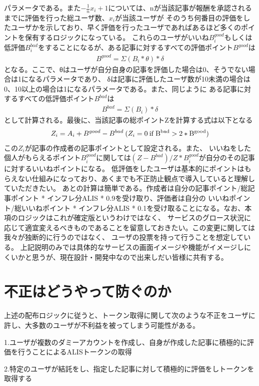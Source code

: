 \documentclass{jsarticle}
\begin{document}
パラメータである。また$-\frac{1}{n}x_{i}+1$については、nが当該記事が報酬を承認されるまでに評価を行った総ユーザ数、$x_{i}$が当該ユーザが
そのうち何番目の評価をしたユーザかを示しており、早く評価を行ったユーザであればあるほど多くのポイントを保有するロジックになっている。
これらのユーザがいいね$B^{good}_{i}$もしくは低評価$B^{bad}_{i}$をすることになるが、ある記事に対するすべての評価ポイント$B^{good}$は
\begin{align}
B^{good} = Σ (B_{i} * θ)  * δ 
\end{align}
となる。ここで、θはユーザが自分自身の記事を評価した場合は0、そうでない場合は1になるパラメータであり、
δは記事に評価したユーザ数が10未満の場合は0、10以上の場合は1になるパラメータである。また、同じように
ある記事に対するすべての低評価ポイント$B^{bad}$は
\begin{align}
B^{bad} = Σ (B_{i}) * δ
\end{align}
として計算される。最後に、当該記事の総ポイントZを計算する式は以下となる
\begin{align}
Z_{i} = A_{i} + B^{good} - B^{bad}\:( Z_{i} = 0 \rm \:if\: B^{bad} > 2*B^{good})
\end{align}
この$Z_{i}$が記事の作成者の記事ポイントとして設定される。また、
いいねをした個人がもらえるポイント$B^{good}_{i}$に関しては$(Z - B^{bad}) / Z * B^{good}_{i}$が自分のその記事に対するいいねポイントになる。
低評価をしたユーザは基本的にポイントはもらえない仕組みになっており、あくまでも不正防止観点で導入していると理解していただきたい。
あとの計算は簡単である。作成者は自分の記事ポイント/総記事ポイント * インフレ分ALIS * 0.9を受け取り、評価者は自分の
いいねポイント/総いいねポイント * インフレ分ALIS * 0.1を受け取ることになる。なお、本項のロジックはこれが確定版というわけではなく、
サービスのグロース状況に応じて適宜変えるべきものであることを留意しておきたい。この変更に関しては我々が独断的に行うのではなく、
ユーザの投票を持って行うことを想定している。
上記説明のみでは具体的なサービスの画面イメージや機能がイメージしにくいかと思うが、現在設計・開発中なので出来しだい皆様に共有する。
\section{不正はどうやって防ぐのか}
上述の配布ロジックに従うと、トークン取得に関して次のような不正をユーザに許し、大多数のユーザが不利益を被ってしまう可能性がある。

1.ユーザが複数のダミーアカウントを作成し、自身が作成した記事に積極的に評価を行うことによるALISトークンの取得

2.特定のユーザが結託をし、指定した記事に対して積極的に評価をしトークンを取得する
\end{document}
